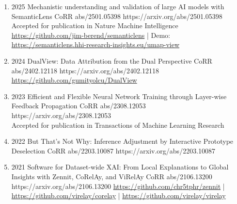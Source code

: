 {\begin{enumerate}
        \item {}
                        {2025}
                        {Mechanistic understanding and validation of large AI models with SemanticLens}
                        {CoRR abs/2501.05398}
                        {https://arxiv.org/abs/2501.05398}
                        {   
                            \\ Accepted for publication in Nature Machine Intelligence
                            \\\href{https://github.com/jim-berend/semanticlens}{https://github.com/jim-berend/semanticlens} | Demo: \href{https://semanticlens.hhi-research-insights.eu/umap-view}{https://semanticlens.hhi-research-insights.eu/umap-view}
                        }

        \item {}
                        {2024}
                        {DualView: Data Attribution from the Dual Perspective}
                        {CoRR abs/2402.12118}
                        {https://arxiv.org/abs/2402.12118}
                        {\\\href{https://github.com/gumityolcu/DualView}{https://github.com/gumityolcu/DualView}}

        \item {}
                        {2023}
                        {Efficient and Flexible Neural Network Training through Layer-wise Feedback Propagation}
                        {CoRR abs/2308.12053}
                        {https://arxiv.org/abs/2308.12053}
                        {
                        \\ Accepted for publication in Transactions of Machine Learning Research
                        }

        \item {}
                        {2022}
                        {But That's Not Why: Inference Adjustment by Interactive Prototype Deselection}
                        {CoRR abs/2203.10087}
                        {https://arxiv.org/abs/2203.10087}

        \item {}
                        {2021}
                        {Software for Dataset-wide XAI: From Local Explanations to Global Insights with Zennit, CoRelAy, and ViRelAy}
                        {CoRR abs/2106.13200}
                        {https://arxiv.org/abs/2106.13200}
                        {   \href{https://github.com/chr5tphr/zennit}{https://github.com/chr5tphr/zennit} | \\
                            \href{https://github.com/virelay/corelay}{https://github.com/virelay/corelay} |
                            \href{https://github.com/virelay/virelay}{https://github.com/virelay/virelay}
                        }


\end{enumerate}}

